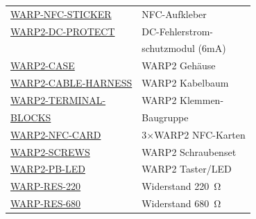 \documentclass[a4paper,10pt]{article}
\begin{document}
\begin{multicols*}{2}
\begin{tabular}{ll}
		\cmidrule(lr{0.5em}){1-2}
		\href{https://www.tinkerforge.com/de/shop/warp/warp2-spare-parts/warp-nfc-sticker.html}{WARP-NFC-STICKER}                   & NFC-Aufkleber                        \\
		\cmidrule(lr{0.5em}){1-2}
		\href{https://www.tinkerforge.com/de/shop/warp/warp2-spare-parts/warp2-dc-protect.html}{WARP2-DC-PROTECT}                   & DC-Fehlerstrom-                      \\
		                                                                                                                            & schutzmodul (6mA)                    \\
		\cmidrule(lr{0.5em}){1-2}
		\href{https://www.tinkerforge.com/de/shop/warp/warp2-spare-parts.html}{WARP2-CASE}                                          & WARP2 Gehäuse                        \\
		\cmidrule(lr{0.5em}){1-2}
		\small{\href{https://www.tinkerforge.com/de/shop/warp/warp2-spare-parts/warp2-cable-harness.html}{WARP2-CABLE-HARNESS}}     & WARP2 Kabelbaum                      \\
		\cmidrule(lr{0.5em}){1-2}
		\href{https://www.tinkerforge.com/de/shop/warp/warp2-spare-parts/warp2-terminal-blocks.html}{WARP2-TERMINAL-}               & WARP2 Klemmen-                       \\
		\href{https://www.tinkerforge.com/de/shop/warp/warp2-spare-parts/warp2-terminal-blocks.html}{BLOCKS}                        & Baugruppe                            \\
		\cmidrule(lr{0.5em}){1-2}
		\href{https://www.tinkerforge.com/de/shop/warp/warp2-spare-parts/warp2-nfc-karte.html}{WARP2-NFC-CARD}                      & 3$\times$WARP2 NFC-Karten            \\
		\cmidrule(lr{0.5em}){1-2}
		\href{https://www.tinkerforge.com/de/shop/warp/warp2-spare-parts/warp2-screws.html}{WARP2-SCREWS}                           & WARP2 Schraubenset                   \\
		\cmidrule(lr{0.5em}){1-2} 
		\href{https://www.tinkerforge.com/de/shop/warp/warp2-spare-parts/warp2-pb-led-set.html}{WARP2-PB-LED}                       & WARP2 Taster/LED                     \\
		\cmidrule(lr{0.5em}){1-2} 
		\href{https://www.tinkerforge.com/de/shop/warp/warp2-spare-parts/warp-res-220.html}{WARP-RES-220}                           & Widerstand \SI{220}{\ohm}            \\
		\cmidrule(lr{0.5em}){1-2} 
		\href{https://www.tinkerforge.com/de/shop/warp/warp2-spare-parts/warp-res-680.html}{WARP-RES-680}                           & Widerstand \SI{680}{\ohm}            \\

\end{tabular}
\end{multicols*}
\end{document}
